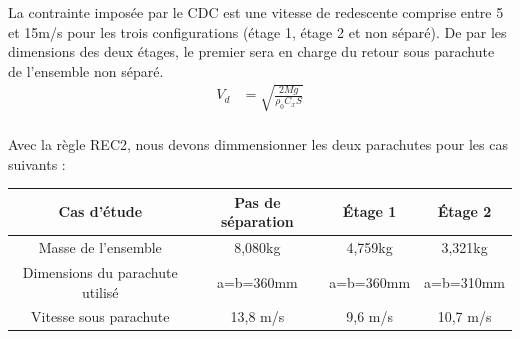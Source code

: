 La contrainte imposée par le \acrshort{CDC} est une vitesse de redescente comprise entre 5 et 15m/s pour les trois configurations (étage 1, étage 2 et non séparé).
De par les dimensions des deux étages, le premier sera en charge du retour sous parachute de l'ensemble non séparé.
\begin{equation}
\begin{aligned}
    V_d &= \sqrt{\frac{2 M g}{\rho_0 C_x S}} \\
\end{aligned}
\end{equation}

Avec la règle REC2, nous devons dimmensionner les deux parachutes pour les cas suivants :

\begin{table}[h!]
\centering
\begin{tabular}{|c|c|c|c|}
\hline
Cas d'étude & Pas de séparation & Étage 1 & Étage 2 \\ \hline
Masse de l'ensemble & 8,080kg & 4,759kg & 3,321kg \\ \hline
Dimensions du parachute utilisé & a=b=360mm & a=b=360mm & a=b=310mm \\ \hline
Vitesse sous parachute & 13,8 m/s & 9,6 m/s & 10,7 m/s\\ \hline
\end{tabular}
\end{table}

